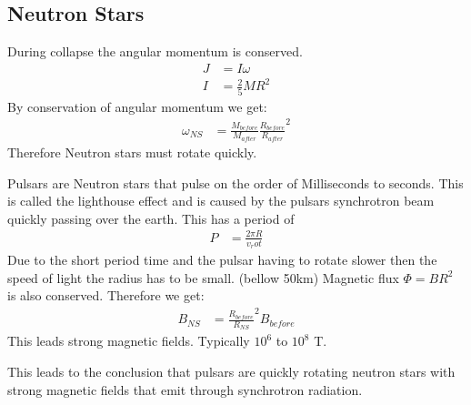 \documentclass[11pt,a4paper]{article}
\begin{document}
\subsection{Neutron Stars}
During collapse the angular momentum is conserved. 
\begin{align*}
    J &= I \omega \\ 
    I &= \frac 2 5 MR^2
\end{align*}
By conservation of angular momentum we get: 
\begin{align*}
    \omega_{NS} &= \frac {M_{before}}{M_{after}} \frac {R_{before}}{R_{after}}^2  
\end{align*}
Therefore Neutron stars must rotate quickly. 

Pulsars are Neutron stars that pulse on the order of Milliseconds to seconds. 
This is called the lighthouse effect and is caused by the pulsars synchrotron beam quickly passing over the earth. 
This has a period of
\begin{align*}
    P &= \frac {2 \pi R}{v_rot} 
\end{align*}
Due to the short period time and the pulsar having to rotate slower then the speed of light the radius has to be small. (bellow 50km)
Magnetic flux $\Phi = BR^2$ is also conserved. 
Therefore we get:
\begin{align*}
    B_{NS} &= \frac {R_{before}} {R_{NS}}^2 B_{before} 
\end{align*}
This leads strong magnetic fields. 
Typically $10^6$ to $10^8$ T. 

This leads to the conclusion that pulsars are quickly rotating neutron stars with strong magnetic fields that emit through synchrotron radiation.
\end{document}
